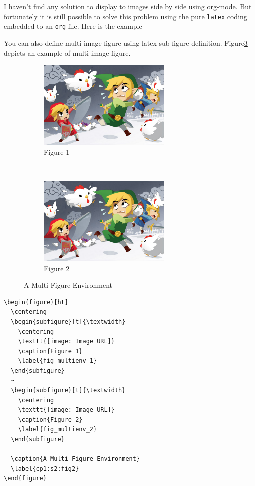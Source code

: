 \documentclass[11pt]{article}
\begin{document}
I haven't find any solution to display to images side by side using org-mode.
But fortunately it is still possible to solve this problem using the pure \texttt{latex}
coding embedded to an \texttt{org} file. Here is the example

You can also define multi-image figure using latex sub-figure definition.
Figure\ref{cp1:s2:fig2} depicts an example of multi-image figure.

\begin{figure}[ht]
	\centering
	\begin{subfigure}[t]{\textwidth}
		\centering
		\includegraphics[width=0.7\textwidth]{figures/Sample/tumblr_static_eaceks0rfxsss8o4swscw40wo.jpg}
		\caption{Figure 1}
		\label{fig_multienv_1}
	\end{subfigure}
	~
	\begin{subfigure}[t]{\textwidth}
		\centering
		\includegraphics[width=0.7\textwidth]{figures/Sample/tumblr_static_eaceks0rfxsss8o4swscw40wo.jpg}
		\caption{Figure 2}
		\label{fig_multienv_2}
	\end{subfigure}
	
	\caption{A Multi-Figure Environment}
	\label{cp1:s2:fig2}
\end{figure}

\begin{verbatim}
\begin{figure}[ht]
  \centering
  \begin{subfigure}[t]{\textwidth}
    \centering
    \texttt{[image: Image URL]}
    \caption{Figure 1}
    \label{fig_multienv_1}
  \end{subfigure}
  ~
  \begin{subfigure}[t]{\textwidth}
    \centering
    \texttt{[image: Image URL]}
    \caption{Figure 2}
    \label{fig_multienv_2}
  \end{subfigure}

  \caption{A Multi-Figure Environment}
  \label{cp1:s2:fig2}
\end{figure}
\end{verbatim}
\end{document}
